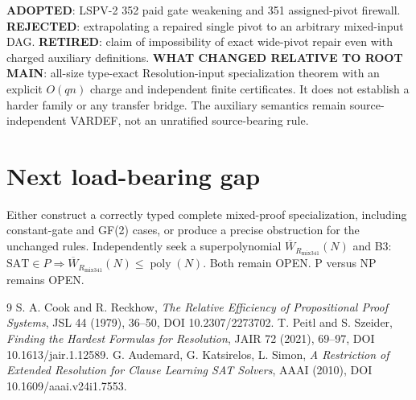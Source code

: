 \documentclass[11pt]{article}
\begin{document}
\noindent\textbf{ADOPTED}: LSPV-2 352 paid gate weakening and 351 assigned-pivot firewall. \textbf{REJECTED}: extrapolating a repaired single pivot to an arbitrary mixed-input DAG. \textbf{RETIRED}: claim of impossibility of exact wide-pivot repair even with charged auxiliary definitions. \textbf{WHAT CHANGED RELATIVE TO ROOT MAIN}: all-size type-exact Resolution-input specialization theorem with an explicit $O(qn)$ charge and independent finite certificates. It does not establish a harder family or any transfer bridge. The auxiliary semantics remain source-independent VARDEF, not an unratified source-bearing rule.

\section*{Next load-bearing gap}
Either construct a correctly typed complete mixed-proof specialization, including constant-gate and GF(2) cases, or produce a precise obstruction for the unchanged rules. Independently seek a superpolynomial $\overline W_{R_{\mathrm{mix341}}}(N)$ and B3: $\mathrm{SAT}\in P\Rightarrow\overline W_{R_{\mathrm{mix341}}}(N)\le\operatorname{poly}(N)$. Both remain OPEN. P versus NP remains OPEN.

\begin{thebibliography}{9}
 S. A. Cook and R. Reckhow, \emph{The Relative Efficiency of Propositional Proof Systems}, JSL 44 (1979), 36--50, DOI 10.2307/2273702.
 T. Peitl and S. Szeider, \emph{Finding the Hardest Formulas for Resolution}, JAIR 72 (2021), 69--97, DOI 10.1613/jair.1.12589.
 G. Audemard, G. Katsirelos, L. Simon, \emph{A Restriction of Extended Resolution for Clause Learning SAT Solvers}, AAAI (2010), DOI 10.1609/aaai.v24i1.7553.
\end{thebibliography}
\end{document}
